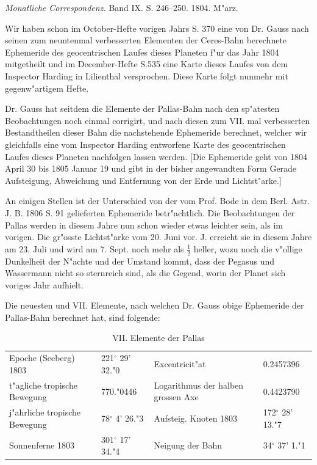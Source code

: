 \documentclass[12pt,a4paper]{article}
\begin{document}
\textit{Monatliche Correspondenz.} Band IX. S. 246--250. 1804. M"arz.

Wir haben schon im October-Hefte vorigen Jahrs S. 370 eine von Dr. Gauss nach seinen zum neuntenmal verbesserten Elementen der Ceres-Bahn berechnete Ephemeride des geocentrischen Laufes dieses Planeten f"ur das Jahr 1804 mitgetheilt und im December-Hefte S.535 eine Karte dieses Laufes von dem Inspector Harding in Lilienthal versprochen. Diese Karte folgt nunmehr mit gegenw"artigem Hefte.

Dr. Gauss hat seitdem die Elemente der Pallas-Bahn nach den sp"atesten Beobachtungen noch einmal corrigirt, und nach diesen zum VII. mal verbesserten Bestandtheilen dieser Bahn die nachstehende Ephemeride berechnet, welcher wir gleichfalls eine vom Inspector Harding entworfene Karte des geocentrischen Laufes dieses Planeten nachfolgen lassen werden. [Die Ephemeride geht von 1804 April 30 bis 1805 Januar 19 und gibt in der bisher angewandten Form Gerade Aufsteigung, Abweichung und Entfernung von der Erde und Lichtst"arke.]

An einigen Stellen ist der Unterschied von der vom Prof. Bode in dem Berl. Astr. J. B. 1806 S. 91 gelieferten Ephemeride betr"achtlich. Die Beobachtungen der Pallas werden in diesem Jahre nun schon wieder etwas leichter sein, als im vorigen. Die gr"osste Lichtst"arke vom 20. Juni vor. J. erreicht sie in diesem Jahre am 23. Juli und wird am 7. Sept. noch mehr als $\frac{1}{2}$ heller, wozu noch die v"ollige Dunkelheit der N"achte und der Umstand kommt, dass der Pegasus und Wassermann nicht so sternreich sind, als die Gegend, worin der Planet sich voriges Jahr aufhielt.

Die neuesten und VII. Elemente, nach welchen Dr. Gauss obige Ephemeride der Pallas-Bahn berechnet hat, sind folgende:

\begin{table}[H]
\centering
\begin{tabular}{l l | l l}
\toprule
Epoche (Seeberg) 1803 & 221$^\circ$ 29' 32."0 & Excentricit"at & 0.2457396 \\
t"agliche tropische Bewegung & 770."0446 & Logarithmus der halben grossen Axe & 0.4423790 \\
j"ahrliche tropische Bewegung & 78$^\circ$ 4' 26."3 & Aufsteig. Knoten 1803 & 172$^\circ$ 28' 13."7 \\
Sonnenferne 1803 & 301$^\circ$ 17' 34."4 & Neigung der Bahn & 34$^\circ$ 37' 1."1 \\
\bottomrule
\end{tabular}
\caption{VII. Elemente der Pallas}
\end{table}
\end{document}
